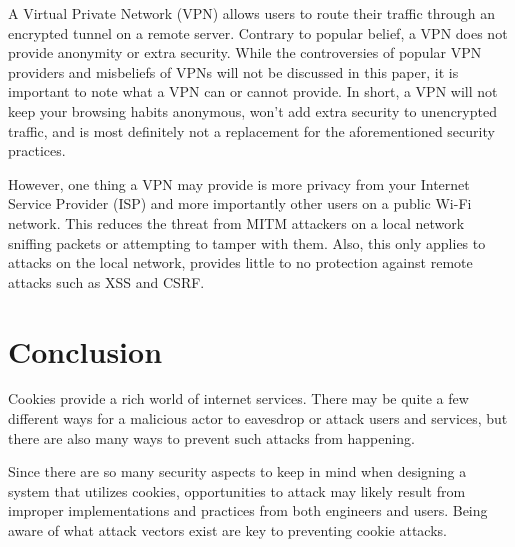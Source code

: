 \documentclass[conference,12pt]{IEEEtran}
\begin{document}
A Virtual Private Network (VPN) allows users to route their traffic through an
encrypted tunnel on a remote server.  Contrary to popular belief, a VPN does not
provide anonymity or extra security. While the controversies of popular VPN
providers and misbeliefs of VPNs will not be discussed in this paper, it is
important to note what a VPN can or cannot provide.  In short, a VPN will not
keep your browsing habits anonymous, won’t add extra security to unencrypted
traffic, and is most definitely not a replacement for the aforementioned
security practices.

However, one thing a VPN may provide is more privacy from your Internet Service
Provider (ISP) and more importantly other users on a public Wi-Fi network.  This
reduces the threat from MITM attackers on a local network sniffing packets or
attempting to tamper with them.  Also, this only applies to attacks on the local
network, provides little to no protection against remote attacks such as XSS and
CSRF.

\section*{Conclusion}

Cookies provide a rich world of internet services.  There may be quite a few
different ways for a malicious actor to eavesdrop or attack users and services,
but there are also many ways to prevent such attacks from happening.

Since there are so many security aspects to keep in mind when designing a system
that utilizes cookies, opportunities to attack may likely result from improper
implementations and practices from both engineers and users.  Being aware of
what attack vectors exist are key to preventing cookie attacks.
\end{document}
